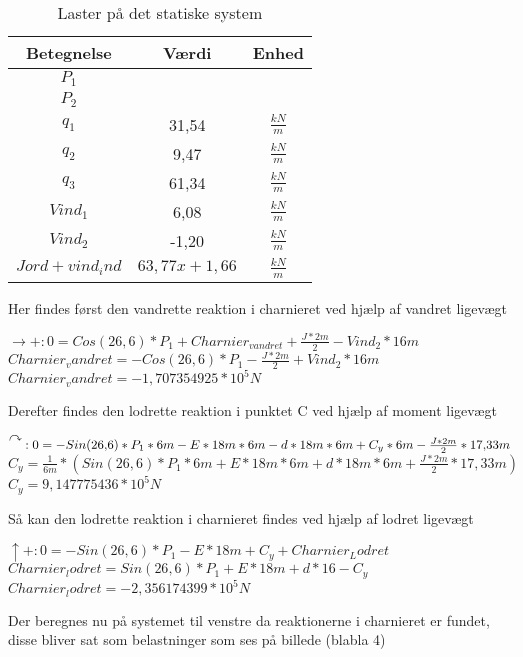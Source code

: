 \begin{table}
	\begin{center}
		\begin{tabular}{|c|c|c|}
			\hline
Betegnelse     & Værdi & Enhed \\ \hline
$P_1$           &       &       \\ \hline
$P_2$           &       &       \\ \hline
$q_1$           & 31,54 & $\frac{kN}{m}$ \\ \hline
$q_2$           & 9,47  & $\frac{kN}{m}$ \\ \hline
$q_3$           & 61,34 & $\frac{kN}{m}$ \\ \hline
$Vind_1$        & 6,08  & $\frac{kN}{m}$ \\ \hline
$Vind_2$       	& -1,20 & $\frac{kN}{m}$ \\ \hline
$Jord+vind_ind$ & $63,\!77x + 1,\!66$ & $\frac{kN}{m}$ \\ \hline
		\end{tabular}
		\caption{Laster på det statiske system}
		\label{tab:laster}
	\end{center}
\end{table}

Her findes først den vandrette reaktion i charnieret ved hjælp af vandret ligevægt
\begin{center}
	$\rightarrow+:0=Cos(26,\!6)*P_1+Charnier_{vandret}+\frac{J*2m}{2}-Vind_2*16m$
	$Charnier_vandret=-Cos(26,\!6)*P_1-\frac{J*2m}{2}+Vind_2*16m$
	$Charnier_vandret=-1,\!707354925*10^5N$
\end{center}

Derefter findes den lodrette reaktion i punktet C ved hjælp af moment ligevægt
\begin{center}
	$\AR{}:0=-Sin(26,\!6)*P_1*6m-E*18m*6m-d*18m*6m+C_y*6m-\frac{J*2m}{2}*17,\!33m$
	$C_y=\frac{1}{6m}*(Sin(26,\!6)*P_1*6m+E*18m*6m+d*18m*6m+\frac{J*2m}{2}*17,\!33m)$
	$C_y=9,\!147775436*10^5N$ 
\end{center}

Så kan den lodrette reaktion i charnieret findes ved hjælp af lodret ligevægt
\begin{center}
	$\uparrow+:0=-Sin(26,\!6)*P_1-E*18m+C_y+Charnier_Lodret$
	$Charnier_lodret=Sin(26,\!6)*P_1+E*18m+d*16-C_y$
	$Charnier_lodret=-2,\!356174399*10^5N$
\end{center}

Der beregnes nu på systemet til venstre da reaktionerne i charnieret er fundet, disse bliver sat som belastninger som ses på billede (blabla 4)

